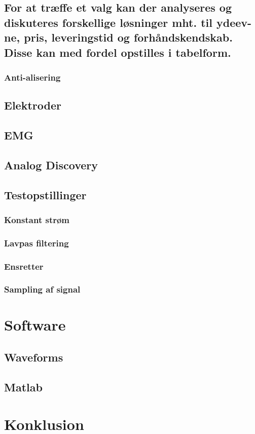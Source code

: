\documentclass[main.tex]{subfiles}
\begin{document}
\section{For at træffe et valg kan der analyseres og diskuteres forskellige løsninger mht. til ydeev-ne, pris, leveringstid og forhåndskendskab. Disse kan med fordel opstilles i tabelform.}

\subsection{Anti-alisering}
\section{Elektroder}
\section{EMG}
\section{Analog Discovery}
\section{Testopstillinger}
\subsection{Konstant strøm}
\subsection{Lavpas filtering}
\subsection{Ensretter}
\subsection{Sampling af signal}




\chapter{Software}
\section{Waveforms}
\section{Matlab}

\chapter{Konklusion}


\end{document}
